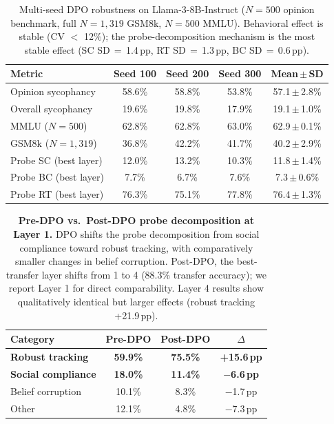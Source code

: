 \documentclass{article}
\begin{document}
\begin{table}[!ht]
\centering
\caption{Multi-seed DPO robustness on Llama-3-8B-Instruct ($N{=}500$ opinion benchmark, full $N{=}1{,}319$ GSM8k, $N{=}500$ MMLU). Behavioral effect is stable (CV $<$ 12\%); the probe-decomposition mechanism is the most stable effect (SC SD\,$=$\,1.4\,pp, RT SD\,$=$\,1.3\,pp, BC SD\,$=$\,0.6\,pp).}
\label{tab:dpo_multiseed}
\small
\begin{tabular}{@{}lcccc@{}}
\toprule
\textbf{Metric} & \textbf{Seed 100} & \textbf{Seed 200} & \textbf{Seed 300} & \textbf{Mean\,$\pm$\,SD} \\
\midrule
Opinion sycophancy & 58.6\% & 58.8\% & 53.8\% & 57.1\,$\pm$\,2.8\% \\
Overall sycophancy & 19.6\% & 19.8\% & 17.9\% & 19.1\,$\pm$\,1.0\% \\
MMLU ($N{=}500$) & 62.8\% & 62.8\% & 63.0\% & 62.9\,$\pm$\,0.1\% \\
GSM8k ($N{=}1{,}319$) & 36.8\% & 42.2\% & 41.7\% & 40.2\,$\pm$\,2.9\% \\
Probe SC (best layer) & 12.0\% & 13.2\% & 10.3\% & 11.8\,$\pm$\,1.4\% \\
Probe BC (best layer) & 7.7\% & 6.7\% & 7.6\% & 7.3\,$\pm$\,0.6\% \\
Probe RT (best layer) & 76.3\% & 75.1\% & 77.8\% & 76.4\,$\pm$\,1.3\% \\
\bottomrule
\end{tabular}
\end{table}

\begin{table}[!ht]
\centering
\caption{\textbf{Pre-DPO vs.\ Post-DPO probe decomposition at Layer 1.} DPO shifts the probe decomposition from social compliance toward robust tracking, with comparatively smaller changes in belief corruption. Post-DPO, the best-transfer layer shifts from 1 to 4 (88.3\% transfer accuracy); we report Layer 1 for direct comparability. Layer 4 results show qualitatively identical but larger effects (robust tracking +21.9\,pp).}
\label{tab:dpo_probes}
\small
\begin{tabular}{@{}lccc@{}}
\toprule
\textbf{Category} & \textbf{Pre-DPO} & \textbf{Post-DPO} & \textbf{$\Delta$} \\
\midrule
\textbf{Robust tracking} & \textbf{59.9\%} & \textbf{75.5\%} & \textbf{+15.6\,pp} \\
\textbf{Social compliance} & \textbf{18.0\%} & \textbf{11.4\%} & $\boldsymbol{-}$\textbf{6.6\,pp} \\
Belief corruption & 10.1\% & 8.3\% & $-$1.7\,pp \\
Other & 12.1\% & 4.8\% & $-$7.3\,pp \\
\bottomrule
\end{tabular}
\end{table}
\end{document}

